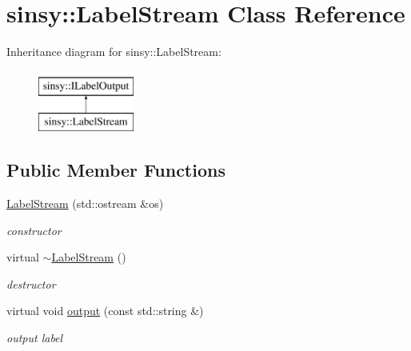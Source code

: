 \hypertarget{classsinsy_1_1LabelStream}{\section{sinsy\-:\-:\-Label\-Stream \-Class \-Reference}
\label{classsinsy_1_1LabelStream}
}
\-Inheritance diagram for sinsy\-:\-:\-Label\-Stream\-:\begin{figure}[H]
\begin{center}
\leavevmode
\includegraphics[height=2.000000cm]{classsinsy_1_1LabelStream}
\end{center}
\end{figure}
\subsection*{\-Public \-Member \-Functions}
\begin{DoxyCompactItemize}
\item 
\hypertarget{classsinsy_1_1LabelStream_a8472d56cb16d61cc3b0f6c45db368f25}{\hyperlink{classsinsy_1_1LabelStream_a8472d56cb16d61cc3b0f6c45db368f25}{\-Label\-Stream} (std\-::ostream \&os)}\label{classsinsy_1_1LabelStream_a8472d56cb16d61cc3b0f6c45db368f25}

\begin{DoxyCompactList}\small\item\em constructor \end{DoxyCompactList}\item 
\hypertarget{classsinsy_1_1LabelStream_a6afb2fa70bb9c1c961cce597d7a28911}{virtual \hyperlink{classsinsy_1_1LabelStream_a6afb2fa70bb9c1c961cce597d7a28911}{$\sim$\-Label\-Stream} ()}\label{classsinsy_1_1LabelStream_a6afb2fa70bb9c1c961cce597d7a28911}

\begin{DoxyCompactList}\small\item\em destructor \end{DoxyCompactList}\item 
virtual void \hyperlink{classsinsy_1_1LabelStream_a594f1eb2ba94797e7b7fa595c215fc46}{output} (const std\-::string \&)
\begin{DoxyCompactList}\small\item\em output label \end{DoxyCompactList}\end{DoxyCompactItemize}


